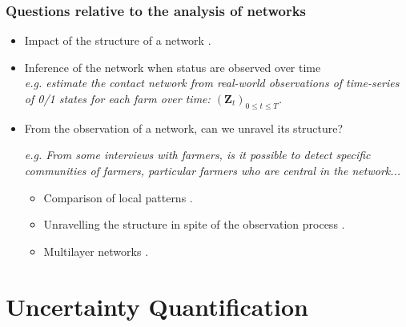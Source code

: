 \documentclass[nopagenumber,9pt]{beamer}
\newcommand{\bZ}{\mathbf{Z}}
\begin{document}
	\begin{frame}
	 \frametitle{Questions relative to the analysis of networks}
	 
	 \begin{itemize}
	  \item Impact of the structure of a network \cite{barbillon2015network}.
	  \medskip
	  
	  \item Inference of the network when status are observed over time \cite{barbillon2019epidemiologic}\\
	  \textit{e.g. estimate the contact network from real-world observations of time-series of 0/1 states for each farm over time: $(\bZ_t)_{0\le t\le T}$.}
	  \medskip
	  
	  
	  \item From the observation of a network, can we unravel its structure? \smallskip
	  
	  \textit{e.g. From some interviews with farmers, is it possible to detect specific communities of farmers, particular farmers who are central in the network...}
	  
	  \begin{itemize}
	   \item Comparison of local patterns \cite{thomasInventory}.
	\smallskip
	
	
	   \item Unravelling the structure in spite of the observation process \cite{tim,missSBM}.\smallskip
	   
	   \item Multilayer networks \cite{barbillon2017stochastic,lazega2016effects,bar2018block,chabert2019stochastic}. 
	  \smallskip
	  
	  \end{itemize}

	  
	  
	  
	 \end{itemize}

	 
	\end{frame}
	
	
	
\section{Uncertainty Quantification}
\end{document}
